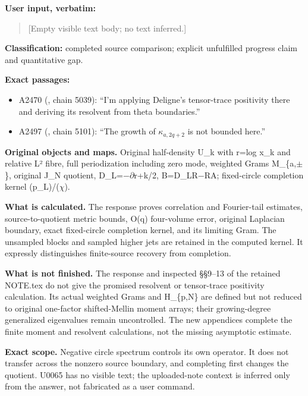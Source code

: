 \textbf{User input, verbatim:}

\begin{quote}
{[}Empty visible text body; no text inferred.{]}
\end{quote}

\textbf{Classification:} completed source comparison; explicit
unfulfilled progress claim and quantitative gap.

\textbf{Exact passages:}

\begin{itemize}
\tightlist
\item
  A2470 (\protect{}, chain
  5039): ``I'm applying Deligne's tensor-trace positivity there and
  deriving its resolvent from theta boundaries.''
\item
  A2497 (\protect{}, chain
  5101): ``The growth of \(\kappa_{a,2q+2}\) is not bounded here.''
\end{itemize}

\textbf{Original objects and maps.} Original half-density U\_k with
r=log x\_k and relative L² fibre, full periodization including zero
mode, weighted Grams M\_\{a,\allowbreak{}\ensuremath{±}\allowbreak{}\},
original J\_N quotient,
D\_L=\allowbreak{}\ensuremath{−}\allowbreak{}\allowbreak{}\ensuremath{∂}\allowbreak{}r+k/2,
B=D\_LR\allowbreak{}\ensuremath{−}\allowbreak{}RA; fixed-circle
completion kernel (p\_L)/(\allowbreak{}\ensuremath{χ}\allowbreak{}).

\textbf{What is calculated.} The response proves correlation and
Fourier-tail estimates, source-to-quotient metric bounds, O(q)
four-volume error, original Laplacian boundary, exact fixed-circle
completion kernel, and its limiting Gram. The unsampled blocks and
sampled higher jets are retained in the computed kernel. It expressly
distinguishes finite-source recovery from completion.

\textbf{What is not finished.} The response and inspected §§9--13 of the
retained NOTE.tex do not give the promised resolvent or tensor-trace
positivity calculation. Its actual weighted Grams and H\_\{p,N\} are
defined but not reduced to original one-factor shifted-Mellin moment
arrays; their growing-degree generalized eigenvalues remain
uncontrolled. The new appendices complete the finite moment and
resolvent calculations, not the missing asymptotic estimate.

\textbf{Exact scope.} Negative circle spectrum controls its own
operator. It does not transfer across the nonzero source boundary, and
completing first changes the quotient. U0065 has no visible text; the
uploaded-note context is inferred only from the answer, not fabricated
as a user command.

